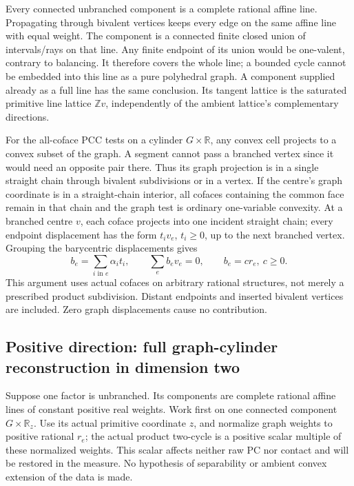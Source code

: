 \documentclass[
  11pt,
]{article}
\begin{document}
Every connected unbranched component is a complete rational affine line.
Propagating through bivalent vertices keeps every edge on the same
affine line with equal weight. The component is a connected finite
closed union of intervals/rays on that line. Any finite endpoint of its
union would be one-valent, contrary to balancing. It therefore covers
the whole line; a bounded cycle cannot be embedded into this line as a
pure polyhedral graph. A component supplied already as a full line has
the same conclusion. Its tangent lattice is the saturated primitive line
lattice \(\mathbb Zv\), independently of the ambient lattice's
complementary directions.

For the all-coface PCC tests on a cylinder \(G\times\mathbb{R}\), any
convex cell projects to a convex subset of the graph. A segment cannot
pass a branched vertex since it would need an opposite pair there. Thus
its graph projection is in a single straight chain through bivalent
subdivisions or in a vertex. If the centre's graph coordinate is in a
straight-chain interior, all cofaces containing the common face remain
in that chain and the graph test is ordinary one-variable convexity. At
a branched centre \(v\), each coface projects into one incident straight
chain; every endpoint displacement has the form \(t_i v_e\),
\(t_i\geq0\), up to the next branched vertex. Grouping the barycentric
displacements gives \[
 b_e=\sum_{i\text{ in }e}\alpha_i t_i,
 \qquad\sum_e b_ev_e=0,\qquad b_e=c r_e,\ c\geq0.           \tag{9}
\] This argument uses actual cofaces on arbitrary rational structures,
not merely a prescribed product subdivision. Distant endpoints and
inserted bivalent vertices are included. Zero graph displacements cause
no contribution.

\subsection{Positive direction: full graph-cylinder reconstruction in
dimension
two}\label{positive-direction-full-graph-cylinder-reconstruction-in-dimension-two}

Suppose one factor is unbranched. Its components are complete rational
affine lines of constant positive real weights. Work first on one
connected component \(G\times\mathbb{R}_z\). Use its actual primitive
coordinate \(z\), and normalize graph weights to positive rational
\(r_e\); the actual product two-cycle is a positive scalar multiple of
these normalized weights. This scalar affects neither raw PC nor contact
and will be restored in the measure. No hypothesis of separability or
ambient convex extension of the data is made.
\end{document}
